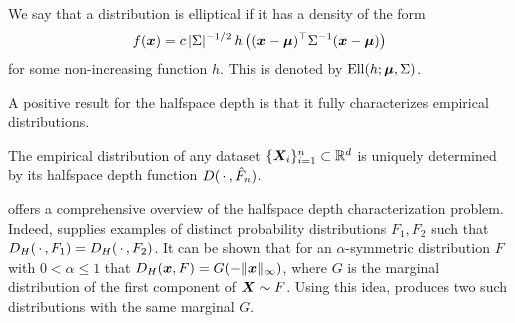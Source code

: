 \begin{definition}
    \label{def:elliptical}
    We say that a distribution is elliptical if it has a density of the form
    \begin{equation}
        f(\bm{x}) = c\, |\Sigma|^{-1/2}\, h\left((\bm{x} - \bm{\mu})^\top \Sigma^{-1} (\bm{x} - \bm{\mu})\right)
    \end{equation}
    for some non-increasing function $h$.
    This is denoted by $\operatorname{Ell}(h; \bm{\mu}, \Sigma)$.
\end{definition}


A positive result for the halfspace depth is that it fully characterizes
empirical distributions.

\begin{theorem}
    The empirical distribution of any dataset $\{\bm{X}_i\}_{i = 1}^n \subset
    \mathbb{R}^d$ is uniquely determined by its halfspace depth function $D(\,\cdot\,,
    \hat{F}_n)$.
\end{theorem}

\textcite{nagy-2020} offers a comprehensive overview of the halfspace depth
characterization problem.
Indeed, \textcite{nagy-2021} supplies examples of distinct probability
distributions $F_1, F_2$ such that $D_H(\,\cdot\,, F_1) = D_H(\,\cdot\,, F_2)$.
It can be shown that for an $\alpha$-symmetric distribution $F$ with $0 <
\alpha \leq 1$ that $D_H(\bm{x}, F) = G(-\Vert \bm{x} \Vert_\infty)$, where $G$ is the
marginal distribution of the first component of $\bm{X} \sim F$.
Using this idea, \textcite{nagy-2021} produces two such distributions with the
same marginal $G$.


